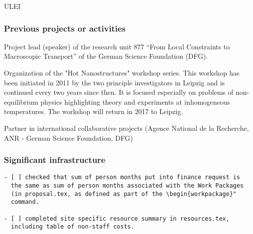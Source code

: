 \begin{sitedescription}{ULEI}
\subsubsection*{Previous projects or activities}

\begin{compactenum}
\item Project lead (speaker) of the research unit 877 ``From Local Constraints to Macroscopic Transport'' of the German Science Foundation (DFG).
%
\item Organization of the "Hot Nanostructures" workshop series.
This workshop has been initiated in 2011 by the two principle investigators in Leipzig and is continued every two years since then. It is focused especially on problems of non-equilibrium physics highlighting theory and experiments at inhomogeneous temperatures. The workshop will return in 2017 to Leipzig.

\item Partner in international collaborative projects (Agence National de la Recherche, ANR - German Science Foundation, DFG)
\end{compactenum}

\subsubsection*{Significant infrastructure}

\end{sitedescription}

\begin{draft}
\vspace{1cm}

\begin{verbatim}
- [ ] checked that sum of person months put into finance request is
  the same as sum of person months associated with the Work Packages
  (in proposal.tex, as defined as part of the \begin{workpackage}"
  command.
  
- [ ] completed site specific resource summary in resources.tex,
  including table of non-staff costs.

\end{verbatim}
\end{draft}

